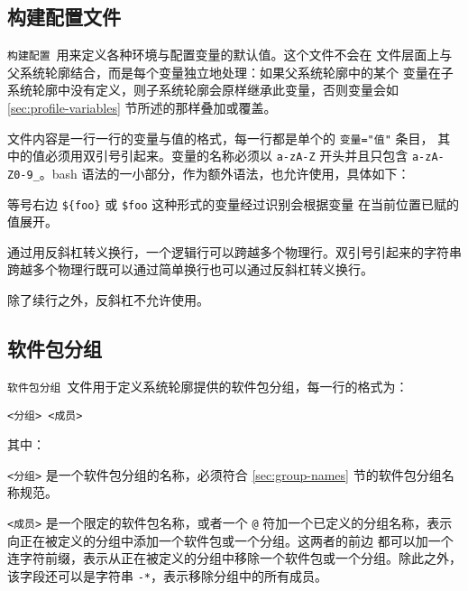 \subsection{构建配置文件}
\texttt{构建配置}\ 用来定义各种环境与配置变量的默认值。这个文件不会在
文件层面上与父系统轮廓结合，而是每个变量独立地处理：如果父系统轮廓中的某个
变量在子系统轮廓中没有定义，则子系统轮廓会原样继承此变量，否则变量会如
\ref{sec:profile-variables} 节所述的那样叠加或覆盖。

文件内容是一行一行的变量与值的格式，每一行都是单个的 \verb|变量="值"| 条目，
其中的值必须用双引号引起来。变量的名称必须以 \texttt{a-zA-Z} 开头并且只包含
\texttt{a-zA-Z0-9_}。bash 语法的一小部分，作为额外语法，也允许使用，具体如下：

\begin{compactitem}
\item 等号右边 \texttt{\$\{foo\}} 或 \texttt{\$foo} 这种形式的变量经过识别会根据变量
    在当前位置已赋的值展开。
\item 通过用反斜杠转义换行，一个逻辑行可以跨越多个物理行。双引号引起来的字符串
    跨越多个物理行既可以通过简单换行也可以通过反斜杠转义换行。
\item 除了续行之外，反斜杠不允许使用。
\end{compactitem}

\subsection{软件包分组}
\texttt{软件包分组}\ 文件用于定义系统轮廓提供的软件包分组，每一行的格式为：

\begin{verbatim}
<分组> <成员>
\end{verbatim}

其中：
\begin{compactitem}
\item \texttt{<\hspace{0em}分组\hspace{0em}>} 是一个软件包分组的名称，必须符合
    \ref{sec:group-names} 节的软件包分组名称规范。
\item \texttt{<\hspace{0em}成员\hspace{0em}>} 是一个限定的软件包名称，或者一个 \texttt{@}
    符加一个已定义的分组名称，表示向正在被定义的分组中添加一个软件包或一个分组。这两者的前边
    都可以加一个连字符前缀，表示从正在被定义的分组中移除一个软件包或一个分组。除此之外，
    该字段还可以是字符串 \texttt{-*}，表示移除分组中的所有成员。
\end{compactitem}

